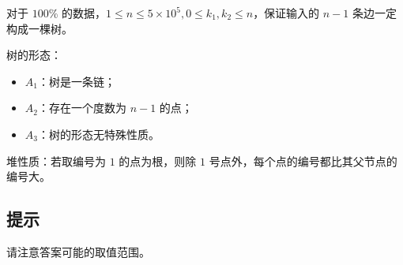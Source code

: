 对于 $100$\% 的数据，$1\le n\le 5\times 10^5,0\le k_1,k_2\le n$，保证输入的 $n-1$ 条边一定构成一棵树。

树的形态：

\begin{itemize}
    \item $A_1$：树是一条链；
    \item $A_2$：存在一个度数为 $n-1$ 的点；
    \item $A_3$：树的形态无特殊性质。
\end{itemize}

堆性质：若取编号为 $1$ 的点为根，则除 $1$ 号点外，每个点的编号都比其父节点的编号大。

\subsection*{提示}

请注意答案可能的取值范围。